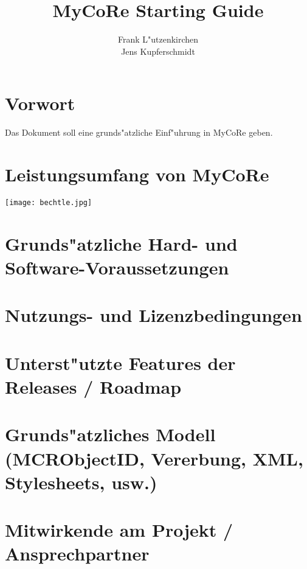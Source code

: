 \documentclass[a4paper,12pt]{book}
\begin{document}
\title{MyCoRe Starting Guide}
\author{
    Frank L"utzenkirchen\\
    Jens Kupferschmidt}
\maketitle
\setcounter{secnumdepth}{10}
\chapter*{Vorwort}
Das Dokument soll eine grunds"atzliche Einf"uhrung in MyCoRe geben.

\tableofcontents
\listoffigures
\listoftables
\chapter{Leistungsumfang von MyCoRe}
\texttt{[image: bechtle.jpg]}
\chapter{Grunds"atzliche Hard- und Software-Voraussetzungen}
\chapter{Nutzungs- und Lizenzbedingungen}
\chapter{Unterst"utzte Features der Releases / Roadmap}
\chapter{Grunds"atzliches Modell (MCRObjectID, Vererbung, XML, Stylesheets, usw.)}
\chapter{Mitwirkende am Projekt / Ansprechpartner}
\end{document}
